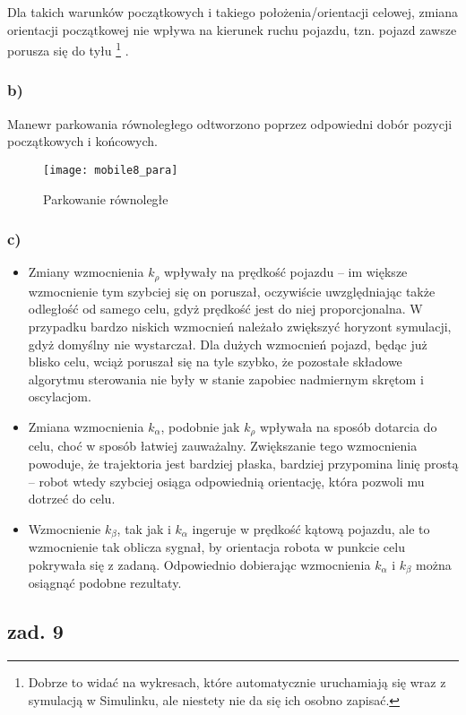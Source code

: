 \documentclass[11pt, a4paper]{article}
\begin{document}
Dla takich warunków początkowych i takiego położenia/orientacji celowej, zmiana orientacji początkowej nie wpływa na kierunek ruchu pojazdu, tzn. pojazd zawsze porusza się do tyłu%
\footnote{Dobrze to widać na wykresach, które automatycznie uruchamiają się wraz z symulacją w Simulinku,
ale niestety nie da się ich osobno zapisać.}
.

\subsubsection*{b)}

Manewr parkowania równoległego odtworzono poprzez odpowiedni dobór pozycji początkowych i końcowych.
\begin{figure}[htbp!]
	\centering
	\texttt{[image: mobile8\_para]}
	\caption{Parkowanie równoległe}
\end{figure}

\subsubsection*{c)}

\begin{itemize}
\item Zmiany wzmocnienia $k_{\rho}$ wpływały na prędkość pojazdu -- im większe wzmocnienie tym szybciej się on poruszał, oczywiście uwzględniając także odległość od samego celu, gdyż prędkość jest do niej proporcjonalna. W przypadku bardzo niskich wzmocnień należało zwiększyć horyzont symulacji, gdyż domyślny nie wystarczał. Dla dużych wzmocnień pojazd, będąc już blisko celu, wciąż poruszał się na tyle szybko, że pozostałe składowe algorytmu sterowania nie były w stanie zapobiec nadmiernym skrętom i oscylacjom.
\item Zmiana wzmocnienia $k_{\alpha}$, podobnie jak $k_{\rho}$ wpływała na sposób dotarcia do celu, choć w sposób łatwiej zauważalny. Zwiększanie tego wzmocnienia powoduje, że trajektoria jest bardziej płaska, bardziej przypomina linię prostą -- robot wtedy szybciej osiąga odpowiednią orientację, która pozwoli mu dotrzeć do celu.
\item Wzmocnienie $k_{\beta}$, tak jak i $k_{\alpha}$ ingeruje w prędkość kątową pojazdu, ale to wzmocnienie tak oblicza sygnał, by orientacja robota w punkcie celu pokrywała się z zadaną. Odpowiednio dobierając wzmocnienia $k_{\alpha}$ i $k_{\beta}$ można osiągnąć podobne rezultaty.
\end{itemize}

\subsection*{zad. 9}
\end{document}
